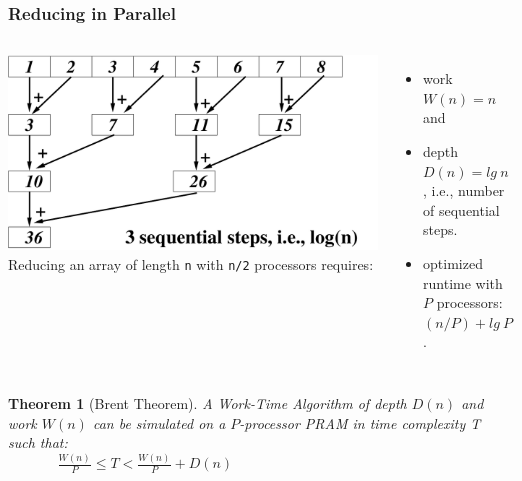 \documentclass{beamer}
\renewcommand{\emph}[1]{\textcolor{structure}{#1}}
\newcommand{\emp}[1]{\textcolor{DikuRed}{ #1}}
\newtheorem{mytheo}{Theorem}
\begin{document}
\begin{frame}
  \frametitle{Reducing in Parallel}

\begin{columns}
        \includegraphics[height=22ex]{Figures/ReduceEg.pdf} 
Reducing an array of length {\tt n} with {\tt  n/2} processors requires:
\begin{itemize}
    \item work $W(n) = n$ and 
    \item depth $D(n) = lg \ n$, i.e., number of sequential steps.
    \item optimized runtime with $P$ processors: \emph{$(n/P) + lg \ P$.}
\end  {itemize}
\end{columns}

\begin{mytheo}[Brent Theorem]\label{BrentTh}
A Work-Time Algorithm of depth $D(n)$ and work $W(n)$ can be
simulated on a $P$-processor PRAM in time complexity T such that:\\\bigskip
\emp{$\ \ \ \ \ \ \ \ \ \ \ \ \ \ \ \ \frac{W(n)}{P} \leq T < \frac{W(n)}{P} + D(n)$}
\end{mytheo}

\end{frame}
\end{document}
